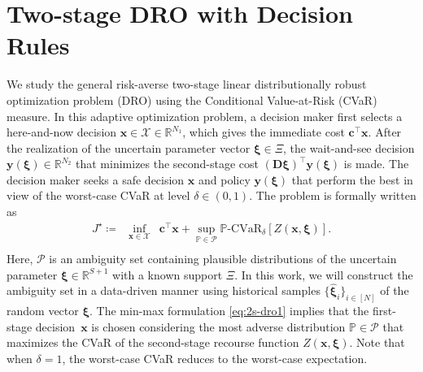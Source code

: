 \documentclass{article}
\newcommand{\PP}{\mathbb{P}}
\newcommand{\RR}{\mathbb{R}}
\newcommand{\X}{\mathcal{X}}
\begin{document}
\section{Two-stage DRO with Decision Rules}
\label{2-stage-DRO}

We study the general risk-averse two-stage  linear distributionally robust  optimization problem (DRO) using the Conditional Value-at-Risk (CVaR) measure. In this adaptive optimization problem, a decision maker first selects a here-and-now decision $\bm x \in \X \in \RR^{N_1}$, which gives the immediate cost $\bm c^\top \bm x$. After the realization of the uncertain parameter vector $\bm \xi\in\Xi$, the wait-and-see decision $\bm y(\bm \xi) \in \RR^{N_2}$ that minimizes the second-stage cost $(\bm D \bm\xi)^\top \bm y(\bm \xi)$ is made. The decision maker seeks a safe decision $\bm x$ and policy $\bm y(\bm \xi)$ that perform the best in view of the worst-case CVaR  at level $\delta \in (0,1)$. The problem is formally written as
\begin{equation}
\label{eq:2s-dro1}
\begin{array}{ccl}
J^{\star} \coloneqq &\displaystyle \inf_{\bm x \in \mathcal{X}} & \bm c^\top \bm x + \displaystyle
\sup_{\PP\in\mathcal P} \PP\text{-CVaR}_\delta [Z(\bm x, \bm \xi)]. \\
\end{array}
\end{equation}
Here, $\mathcal P$ is an ambiguity set containing plausible distributions of the uncertain parameter $\bm \xi \in \RR^{S+1}$ with a known support $\Xi$. In this work, we will construct the ambiguity set in a data-driven manner using historical samples $\{ \hat{\bm\xi}_i\}_{i \in [N]}$ of the random vector $\bm\xi$. The min-max formulation \eqref{eq:2s-dro1} implies that the first-stage decision~$\bm x$ is chosen considering the most adverse distribution $\PP\in\mathcal P$ that maximizes the CVaR of the second-stage recourse function $Z(\bm x, \bm \xi)$. Note that when $\delta = 1$, the worst-case CVaR reduces to the worst-case expectation. 
\end{document}
